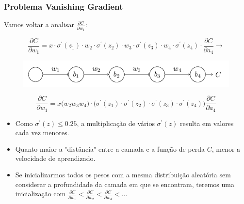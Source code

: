 \documentclass[tikz,10pt]{beamer}
\begin{document}
\begin{frame}
	\frametitle{Problema Vanishing Gradient}
	Vamos voltar a analisar $\frac{\partial C}{\partial w_1}$:
	
	$$ \frac{\partial C}{\partial w_1} = x \cdot \sigma^{'}(z_1) \cdot w_2 \cdot \sigma^{'}(z_2) \cdot w_3 \cdot \sigma^{'}(z_3) \cdot w_4 \cdot  \sigma^{'}(z_4)\cdot\frac{\partial C}{\partial a_4} \rightarrow $$
	\begin{figure}
		\centering
		\includegraphics[scale=0.5]{nnetsimples.png}
	\end{figure}
	$$ \frac{\partial C}{\partial w_1} = x \bigg(w_2 w_3 w_4 \bigg) \cdot \bigg(\sigma^{'}(z_1) \cdot \sigma^{'}(z_2)\cdot \sigma^{'}(z_3) \cdot \sigma^{'}(z_4) \bigg) \frac{\partial C}{\partial a_4} $$
	
	\begin{itemize}
		\item Como $\sigma^{'}(z) \leq 0.25$, a multiplicação de vários $\sigma^{'}(z)$ resulta em valores cada vez menores.
		
		\item Quanto maior a "distância" entre a camada e a função de perda $C$, menor a velocidade de aprendizado.
		
		\item Se inicializarmos todos os pesos com a mesma distribuição aleatória sem considerar a profundidade da camada em que se encontram, teremos uma inicialização com $\frac{\partial C}{\partial w_1} < \frac{\partial C}{\partial w_2} < \frac{\partial C}{\partial w_3} < ... $
	\end{itemize}
	
\end{frame}
\end{document}
